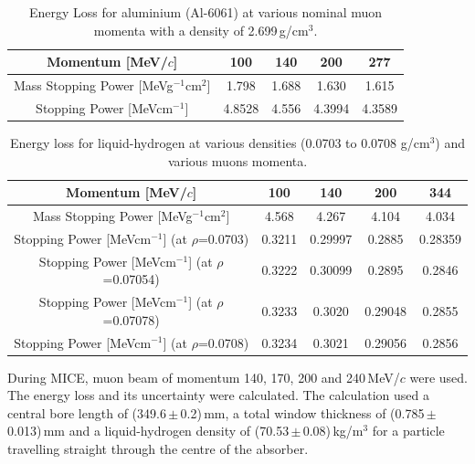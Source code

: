 \begin{table}[htb!]
  \caption{
    Energy Loss for aluminium (Al-6061) at various nominal muon momenta with a density of 2.699\,g/cm$^{3}$.
  }
  \label{tab:Aluminium}
  \begin{center}
    \begin{tabular}{c|c|c|c|c}
    
Momentum [MeV/$c$] & 100 & 140 & 200 & 277     \rule{0pt}{14pt} \\
\hline
{Mass Stopping Power [MeVg${}^{-1}$cm${}^{2}$] } & 1.798 & 1.688 & 1.630 & 1.615
\\
{Stopping Power [MeVcm${}^{-1}$] } & 4.8528 & 4.556 & 4.3994 & 4.3589
\\

    \end{tabular}
  \end{center}
\end{table} 

\begin{table}
  \caption{
    Energy loss for liquid-hydrogen at various densities (0.0703 to 0.0708 g/cm${}^{3}$) and various muons momenta.}
  \label{tab:Hydrogen}
  \begin{center}
    \begin{tabular}{c|c|c|c|c}
Momentum [MeV/$c$] & 100 & 140 & 200 & 344     \rule{0pt}{14pt} \\
\hline
{Mass Stopping Power [MeVg${}^{-1}$cm${}^{2}$] } & 4.568 & 4.267 & 4.104 & 4.034 \\
{Stopping Power [MeVcm${}^{-1}$] }(at $\rho$=0.0703)\textbf{} & 0.3211 & 0.29997 & 0.2885 & 0.28359\\
{Stopping Power [MeVcm${}^{-1}$] }(at $\rho$=0.07054)\textbf{} & 0.3222 & 0.30099 & 0.2895 & 0.2846 \\
{Stopping Power [MeVcm${}^{-1}$] }(at $\rho$=0.07078)\textbf{} & 0.3233 & 0.3020 & 0.29048 & 0.2855 \\
{Stopping Power [MeVcm${}^{-1}$] }(at $\rho$=0.0708)\textbf{} & 0.3234 & 0.3021 & 0.29056 & 0.2856 \\
    \end{tabular}
  \end{center}
\end{table} 


During MICE, muon beam of momentum 140, 170, 200 and 240\,MeV/$c$ were used. The energy loss and its uncertainty were calculated. The calculation used a central bore length of (349.6\,$\mathrm{\pm}$\,0.2)\,mm, a total window thickness of (0.785\,$\mathrm{\pm}$\,0.013)\,mm and a liquid-hydrogen density of (70.53\,$\mathrm{\pm}$\,0.08)\,kg/m$^{3}$ for a particle travelling straight through the centre of the absorber.

